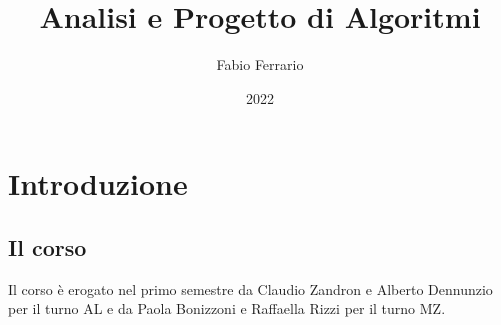 \documentclass[12pt, a4paper, openany]{book}
\begin{document}
\title{Analisi e Progetto di Algoritmi}
\author{Fabio Ferrario}
\date{2022}
\maketitle

\tableofcontents

\chapter*{Introduzione}
\section{Il corso}
Il corso è erogato nel primo semestre da Claudio Zandron e Alberto Dennunzio per il turno AL e da Paola Bonizzoni e Raffaella Rizzi per il turno MZ.
\end{document}
